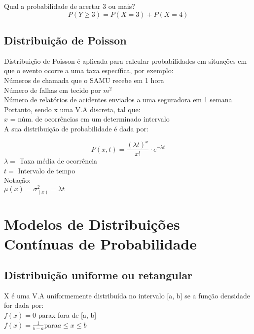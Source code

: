 \documentclass{article}
\begin{document}
{Qual a probabilidade de acertar 3 ou mais?\\
\[P(Y\geq 3)=P(X=3)+P(X=4)\]

\newpage
\subsection{Distribuição de Poisson}
Distribuição de Poisson é aplicada para calcular probabilidades em situações em que o evento ocorre a uma taxa específica, por exemplo:\\
\noindent Números de chamada que o SAMU recebe em 1 hora\\
\noindent Número de falhas em tecido por $m^2$\\
\noindent Número de relatórios de acidentes enviados a uma seguradora em 1 semana\\

\noindent Portanto, sendo x uma V.A discreta, tal que:\\
\noindent $x$ = núm. de ocorrências em um determinado intervalo\\

\indent A sua distribuição de probabilidade é dada por:

\[P(x,t)=\frac{(\lambda t)^x}{x!}\cdot e^{-\lambda t}\]
\noindent $\lambda=$ Taxa média de ocorrência\\
\noindent $t=$ Intervalo de tempo\\


\noindent Notação: \\
\noindent$\mu(x)=\sigma^2_{(x)}=\lambda t$

\section{Modelos de Distribuições Contínuas de Probabilidade}
\subsection{Distribuição uniforme ou retangular}
X é uma V.A uniformemente distribuída no intervalo [a, b] se a função densidade for dada por:\\

\noindent$\displaystyle \boxed{f(x)=0}$ \hspace{1.5cm} para\;\;x fora de [a, b]\\
$\boxed{f(x)=\displaystyle \frac{1}{b-a}}$\hspace{1.5cm}para\;\;$a\leq x \leq b$\\

}
\end{document}
